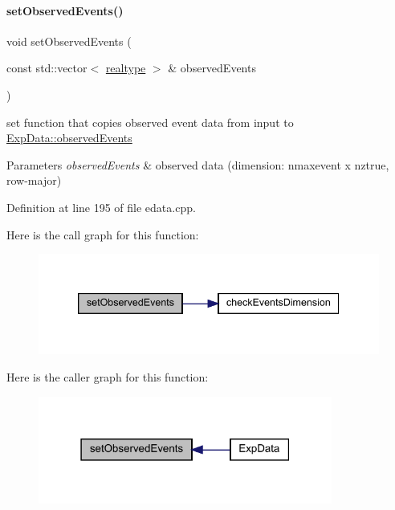 \paragraph{\texorpdfstring{set\+Observed\+Events()}{setObservedEvents()}\hspace{0.1cm}{\footnotesize\ttfamily [1/2]}}
{\footnotesize\ttfamily void set\+Observed\+Events (\begin{DoxyParamCaption}\item[{const std\+::vector$<$ \mbox{\hyperlink{namespaceamici_a1bdce28051d6a53868f7ccbf5f2c14a3}{realtype}} $>$ \&}]{observed\+Events }\end{DoxyParamCaption})}

set function that copies observed event data from input to \mbox{\hyperlink{classamici_1_1_exp_data_a629e6085839e16bac95ef0eba580f7f0}{Exp\+Data\+::observed\+Events}}


\begin{DoxyParams}{Parameters}
{\em observed\+Events} & observed data (dimension\+: nmaxevent x nztrue, row-\/major) \\
\hline
\end{DoxyParams}


Definition at line 195 of file edata.\+cpp.

Here is the call graph for this function\+:
\nopagebreak
\begin{figure}[H]
\begin{center}
\leavevmode
\includegraphics[width=339pt]{classamici_1_1_exp_data_ae621c2d67f85f390d01a97658c956098_cgraph}
\end{center}
\end{figure}
Here is the caller graph for this function\+:
\nopagebreak
\begin{figure}[H]
\begin{center}
\leavevmode
\includegraphics[width=274pt]{classamici_1_1_exp_data_ae621c2d67f85f390d01a97658c956098_icgraph}
\end{center}
\end{figure}
\mbox{\label{classamici_1_1_exp_data_a22ae335c4988600623e7a0c5ca7b47aa}} 

